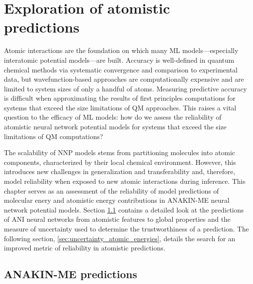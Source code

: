 \chapter{Exploration of atomistic predictions}
\label{chapter2}

Atomic interactions are the foundation on which many ML models---especially interatomic potential models---are built.
Accuracy is well-defined in quantum chemical methods via systematic convergence and comparison to experimental data, but wavefunction-based approaches are computationally expensive and are limited to system sizes of only a handful of atoms.
Measuring predictive accuracy is difficult when approximating the results of first principles computations for systems that exceed the size limitations of QM approaches.
This raises a vital question to the efficacy of ML models: how do we assess the reliability of atomistic neural network potential models for systems that exceed the size limitations of QM computations?

The scalability of NNP models stems from partitioning molecules into atomic components, characterized by their local chemical environment.
However, this introduces new challenges in generalization and transferability and, therefore, model reliability when exposed to new atomic interactions during inference.
This chapter serves as an assessment of the reliability of model predictions of molecular enery and atomistic energy contributions in ANAKIN-ME neural network potential models.
Section \ref{sec:ANI_predictions} contains a detailed look at the predictions of ANI neural networks from atomistic features to global properties and the measure of uncertainty used to determine the trustworthiness of a prediction.
The following section, \ref{sec:uncertainty_atomic_energies}, details the search for an improved metric of reliability in atomistic predictions.

\section{ANAKIN-ME predictions}
\label{sec:ANI_predictions}

